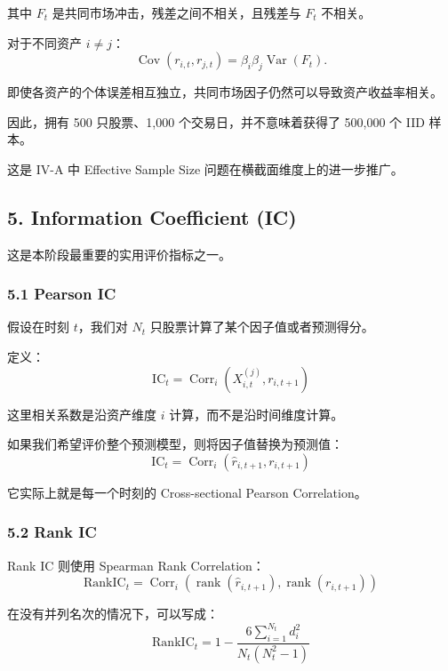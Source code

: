 其中 \(F_t\) 是共同市场冲击，残差之间不相关，且残差与 \(F_t\) 不相关。

对于不同资产 \(i\neq j\)：
\[\boxed{
\operatorname{Cov}(r_{i,t},r_{j,t})
=
\beta_i\beta_j\operatorname{Var}(F_t).
}\]

即使各资产的个体误差相互独立，共同市场因子仍然可以导致资产收益率相关。

因此，拥有 500 只股票、1,000 个交易日，并不意味着获得了 500,000 个 IID 样本。

这是 IV-A 中 Effective Sample Size 问题在横截面维度上的进一步推广。

\hypertarget{part-4-63-0001-information-coefficient-ic}{%
\subsection{5. Information Coefficient (IC)}\label{part-4-63-0001-information-coefficient-ic}}

这是本阶段最重要的实用评价指标之一。

\hypertarget{part-4-63-0001-pearson-ic}{%
\subsubsection{5.1 Pearson IC}\label{part-4-63-0001-pearson-ic}}

假设在时刻 \(t\)，我们对 \(N_t\) 只股票计算了某个因子值或者预测得分。

定义：
\[\boxed{
\mathrm{IC}_t
=
\operatorname{Corr}_{i}
\left(
X_{i,t}^{(j)},r_{i,t+1}
\right)
}\]

这里相关系数是沿资产维度 \(i\) 计算，而不是沿时间维度计算。

如果我们希望评价整个预测模型，则将因子值替换为预测值：
\[\boxed{
\mathrm{IC}_t
=
\operatorname{Corr}_{i}
\left(
\hat r_{i,t+1},r_{i,t+1}
\right)
}\]

它实际上就是每一个时刻的 Cross-sectional Pearson Correlation。

\hypertarget{part-4-63-0001-rank-ic}{%
\subsubsection{5.2 Rank IC}\label{part-4-63-0001-rank-ic}}

Rank IC 则使用 Spearman Rank Correlation：
\[\boxed{
\mathrm{RankIC}_t
=
\operatorname{Corr}_{i}
\left(
\operatorname{rank}(\hat r_{i,t+1}),
\operatorname{rank}(r_{i,t+1})
\right)
}\]

在没有并列名次的情况下，可以写成：
\[\boxed{
\mathrm{RankIC}_t
=
1-
\frac{
6\sum_{i=1}^{N_t}d_i^2
}{
N_t(N_t^2-1)
}
}\]

